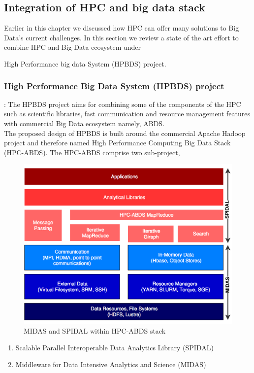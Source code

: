 \documentclass[runningheads,a4paper]{llncs}
\begin{document}
\subsection{Integration of HPC and big data stack}
Earlier in this chapter we discussed how HPC can offer many solutions to Big Data's current challenges. In this section we review a state of the art effort to combine HPC and Big Data ecosystem under {High Performance big data System (HPBDS) project. 

\subsubsection{High Performance Big Data System (HPBDS) project \cite{qiu2014towards}}: The HPBDS project aims for combining some of the components of the HPC such as scientific libraries, fast communication and resource management features with commercial Big Data ecosystem namely, ABDS.\\

The proposed design of HPBDS is built around the commercial Apache Hadoop project and therefore named High Performance Computing Big Data Stack (HPC-ABDS). The HPC-ABDS comprise two sub-project,
\begin{figure}[h]
	\includegraphics[scale=0.25]{./images/hpc_abds.png}
	\centering
	\caption{MIDAS and SPIDAL within HPC-ABDS stack\cite{qiu2014towards}}
	\label{fig:MIDAS_SPIDAL}
\end{figure}
\begin{enumerate}
	\item Scalable Parallel Interoperable Data Analytics Library (SPIDAL)
	\item Middleware for Data Intensive Analytics and Science (MIDAS)  
\end{enumerate}

}
\end{document}
